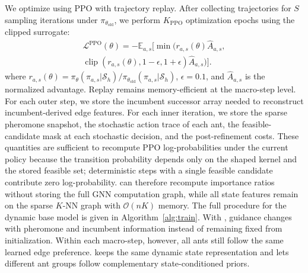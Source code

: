 
% 

We optimize using PPO with trajectory replay.
After collecting trajectories for $S$ sampling iterations under $\pi_{\theta_{\text{old}}}$, we perform $K_{\text{PPO}}$ optimization epochs using the clipped surrogate:
\begin{multline}
\mathcal{L}^{\mathrm{PPO}}(\theta)
= -\mathbb{E}_{a,s}\Big[\min\big(
 r_{a,s}(\theta)\hat{A}_{a,s},\\
\operatorname{clip}\!\left(r_{a,s}(\theta),1-\epsilon,1+\epsilon\right)
\hat{A}_{a,s}\big)\Big].
\end{multline}
where $r_{a,s}(\theta) = \pi_\theta(\pi_{a,s} | \mathcal{S}_h) / \pi_{\theta_{\text{old}}}(\pi_{a,s} | \mathcal{S}_h)$, $\epsilon=0.1$, and $\hat{A}_{a,s}$ is the normalized advantage.
Replay remains memory-efficient at the macro-step level. For each outer step, we store the incumbent successor array needed to reconstruct incumbent-derived edge features. For each inner iteration, we store the sparse pheromone snapshot, the stochastic action trace of each ant, the feasible-candidate mask at each stochastic decision, and the post-refinement costs. These quantities are sufficient to recompute PPO log-probabilities under the current policy because the transition probability depends only on the shaped kernel and the stored feasible set; deterministic steps with a single feasible candidate contribute zero log-probability. \DyNACO{} can therefore recompute importance ratios without storing the full GNN computation graph, while all state features remain on the sparse $K$-NN graph with $\mathcal{O}(nK)$ memory.
The full procedure for the dynamic base model is given in Algorithm~\ref{alg:train}. With \DyNACO{}, guidance changes with pheromone and incumbent information instead of remaining fixed from initialization. Within each macro-step, however, all ants still follow the same learned edge preference. \DyNACS{} keeps the same dynamic state representation and lets different ant groups follow complementary state-conditioned priors.


